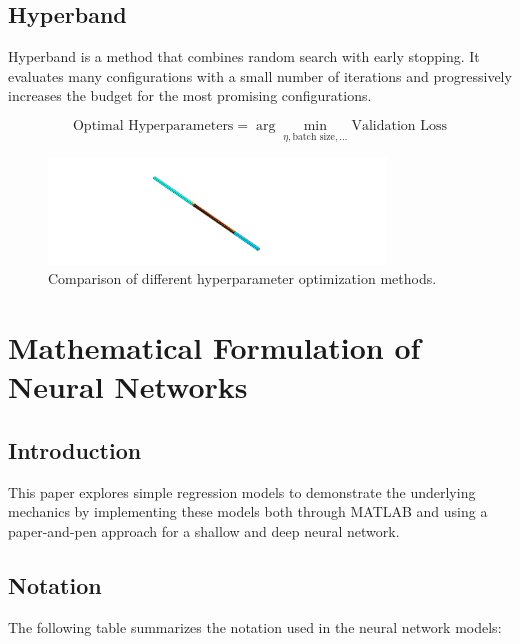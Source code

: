     \subsection{Hyperband}

        Hyperband is a method that combines random search with early stopping. It evaluates many configurations with a small number of iterations and progressively increases the budget for the most promising configurations.

        \begin{equation}
        \text{Optimal Hyperparameters} = \arg \min_{\eta, \text{batch size}, \ldots} \text{Validation Loss}
        \end{equation}

\begin{figure}[h]
    \centering
    \includegraphics[width=0.8\textwidth]{00_Images/00_Velocity.png}
    \caption{Comparison of different hyperparameter optimization methods.}
    \label{fig:hyperparameter_optimization}
\end{figure}

\section{Mathematical Formulation of Neural Networks}
        \subsection{Introduction}
        This paper explores simple regression models to demonstrate the underlying mechanics by implementing these models both through MATLAB and using a paper-and-pen approach for a shallow and deep neural network.

        \newpage \subsection{Notation}
        The following table summarizes the notation used in the neural network models:

